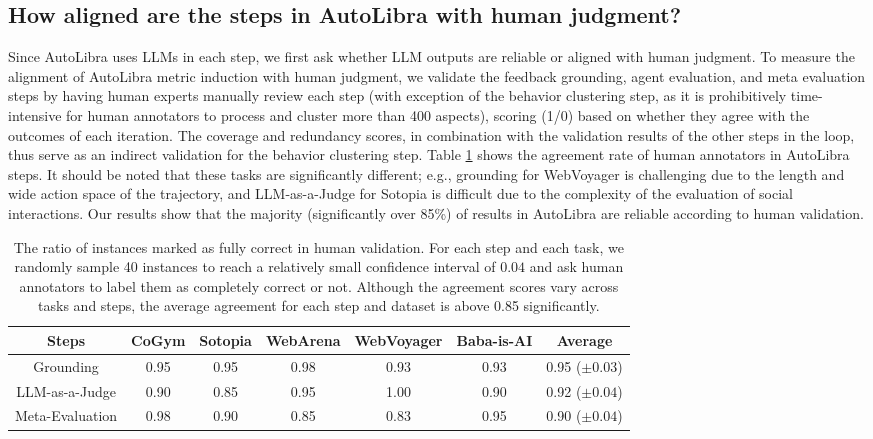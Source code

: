\subsection{How aligned are the steps in AutoLibra with human judgment?}
Since AutoLibra uses LLMs in each step, we first ask whether LLM outputs are reliable
or aligned with human judgment. To measure the alignment of AutoLibra metric
induction with human judgment, we validate the feedback grounding, agent
evaluation, and meta evaluation steps by having human experts manually review each
step (with exception of the behavior clustering step, as it is prohibitively time-intensive
for human annotators to process and cluster more than 400 aspects), scoring (1/0)
based on whether they agree with the outcomes of each iteration. The coverage
and redundancy scores, in combination with the validation results of the other steps
in the loop, thus serve as an indirect validation for the behavior clustering
step. Table \ref{tab:validation} shows the agreement rate of human annotators in
AutoLibra steps. It should be noted that these tasks are significantly different;
e.g., grounding for WebVoyager \citep{he2024webvoyager} is challenging due to
the length and wide action space of the trajectory, and LLM-as-a-Judge for Sotopia
\citep{zhousotopia} is difficult due to the complexity of the evaluation of
social interactions. Our results show that the majority (significantly over 85\%)
of results in AutoLibra are reliable according to human validation.

\begin{table}[!t]
	\centering
	\small
	\begin{tabular}{cccccc|c}
		\toprule Steps     & CoGym & Sotopia & WebArena & WebVoyager & Baba-is-AI & Average           \\
		\midrule Grounding & 0.95  & 0.95    & 0.98     & 0.93       & 0.93       & 0.95 ($\pm 0.03$) \\
		LLM-as-a-Judge     & 0.90  & 0.85    & 0.95     & 1.00       & 0.90       & 0.92 ($\pm 0.04$) \\
		Meta-Evaluation    & 0.98  & 0.90    & 0.85     & 0.83       & 0.95       & 0.90 ($\pm 0.04$) \\
		\bottomrule
	\end{tabular}
	\caption{ The ratio of instances marked as fully correct in human validation.
		For each step and each task, we randomly sample 40 instances to reach a relatively
		small confidence interval of $0.04$ and ask human annotators to label them as completely
		correct or not. Although the agreement scores vary across tasks and steps, the
		average agreement for each step and dataset is above 0.85 significantly. }
	\label{tab:validation}
\end{table}

